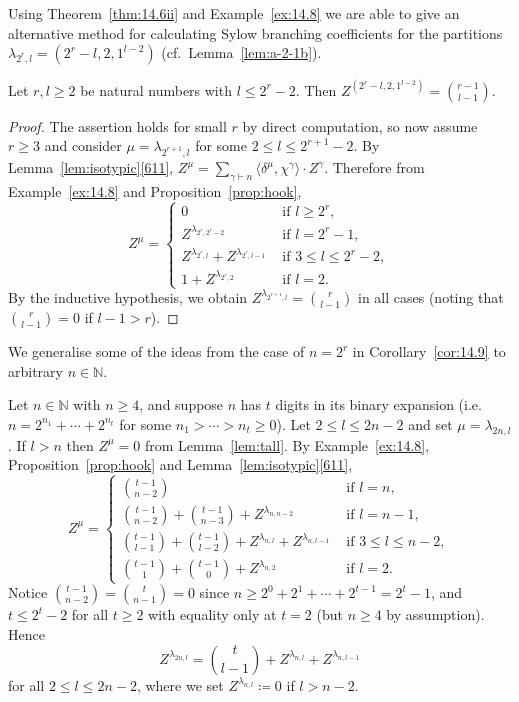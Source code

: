 \documentclass[ALCO, Unicode]{cedram}
\newcommand{\N}{\mathbb{N}}
\begin{document}
Using Theorem~\ref{thm:14.6ii} and Example~\ref{ex:14.8} we are able to give an alternative method for calculating Sylow branching coefficients for the partitions $\lambda_{2^r,l}=(2^r-l,2,1^{l-2})$ (cf.~Lemma~\ref{lem:a-2-1b}).

\begin{corollary}\label{cor:14.9}
	Let $r,l\ge 2$ be natural numbers with $l\le 2^r-2$. Then $Z^{(2^r-l,2,1^{l-2})} = \binom{r-1}{l-1}$.
\end{corollary}

\begin{proof}
	The assertion holds for small $r$ by direct computation, so now assume $r\ge 3$ and consider $\mu=\lambda_{2^{r+1},l}$ for some $2\le l\le 2^{r+1}-2$. By Lemma~\ref{lem:isotypic}\ref{611}, $Z^\mu = \sum_{\gamma\vdash n}\langle\delta^\mu,\chi^\gamma\rangle\cdot Z^\gamma$. Therefore from Example~\ref{ex:14.8} and Proposition~\ref{prop:hook},
	\[ Z^{\mu} = \begin{cases}
		0 & \text{ if }l\ge 2^r,\\
		Z^{\lambda_{2^r,2^r-2}} & \text{ if }l=2^r-1,\\
		Z^{\lambda_{2^r,l}}+Z^{\lambda_{2^r,l-1}} & \text{ if }3\le l\le 2^r-2,\\
		1+Z^{\lambda_{2^r,2}} & \text{ if }l=2.
	\end{cases} \]
	By the inductive hypothesis, we obtain $Z^{\lambda_{2^{r+1},l}} = \binom{r}{l-1}$ in all cases (noting that $\binom{r}{l-1}=0$ if $l-1>r$).
\end{proof}

\begin{remark}\label{rem:general-a-2-1b}
	We generalise some of the ideas from the case of $n=2^r$ in Corollary~\ref{cor:14.9} to arbitrary $n\in\N$.
	
	Let $n\in\N$ with $n\ge 4$, and suppose $n$ has $t$ digits in its binary expansion (i.e.~$n=2^{n_1}+\cdots+2^{n_t}$ for some $n_1>\cdots>n_t\ge 0$). Let $2\le l\le 2n-2$ and set $\mu=\lambda_{2n,l}$. If $l>n$ then $Z^\mu=0$ from Lemma~\ref{lem:tall}. By Example~\ref{ex:14.8}, Proposition~\ref{prop:hook} and Lemma~\ref{lem:isotypic}\ref{611},
	\[ Z^\mu = \begin{cases}
		\binom{t-1}{n-2} & \text{ if }l=n,\\
		\binom{t-1}{n-2}+\binom{t-1}{n-3} + Z^{\lambda_{n,n-2}} & \text{ if }l=n-1,\\
		\binom{t-1}{l-1}+\binom{t-1}{l-2} + Z^{\lambda_{n,l}} + Z^{\lambda_{n,l-1}} & \text{ if }3\le l\le n-2,\\
		\binom{t-1}{1}+\binom{t-1}{0} + Z^{\lambda_{n,2}} & \text{ if }l=2.
	\end{cases} \]
	Notice $\binom{t-1}{n-2}=\binom{t}{n-1}=0$ since $n\ge 2^0+2^1+\cdots+2^{t-1}=2^t-1$, and $t\le 2^t-2$ for all $t\ge 2$ with equality only at $t=2$ (but $n\ge 4$ by assumption). Hence
	\[ Z^{\lambda_{2n,l}} = \binom{t}{l-1} + Z^{\lambda_{n,l}} + Z^{\lambda_{n,l-1}} \]
	for all $2\le l\le 2n-2$, where we set $Z^{\lambda_{n,l}}\coloneqq 0$ if $l>n-2$. %
\end{remark}
\end{document}
